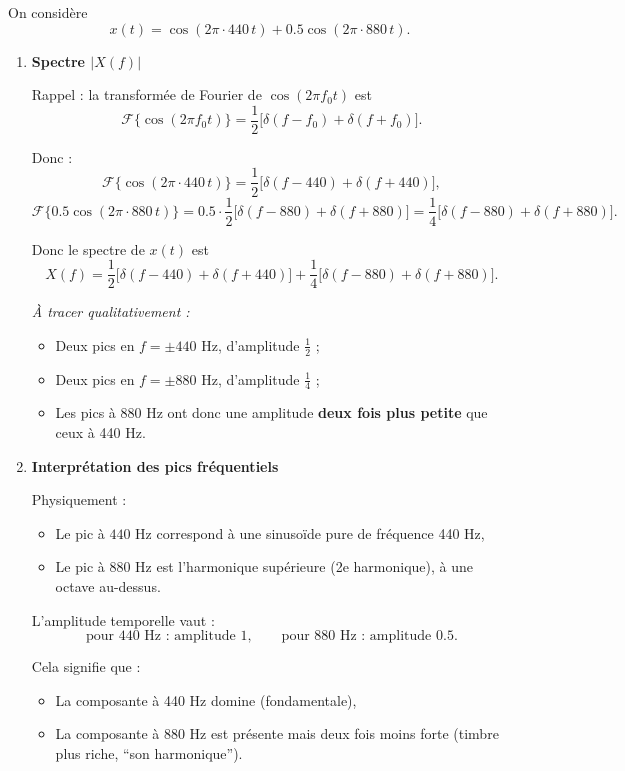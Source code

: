 On considère
\[
x(t) = \cos(2\pi \cdot 440\, t) + 0.5\cos(2\pi \cdot 880\, t).
\]

\begin{enumerate}[label=(\alph*)]

\item \textbf{Spectre $|X(f)|$}

Rappel : la transformée de Fourier de $\cos(2\pi f_0 t)$ est
\[
\mathcal{F}\{\cos(2\pi f_0 t)\}
= \frac{1}{2}\big[\delta(f-f_0) + \delta(f+f_0)\big].
\]

Donc :
\[
\mathcal{F}\{\cos(2\pi \cdot 440\, t)\}
= \frac{1}{2}\big[\delta(f-440) + \delta(f+440)\big],
\]
\[
\mathcal{F}\{0.5\cos(2\pi \cdot 880\, t)\}
= 0.5 \cdot \frac{1}{2}\big[\delta(f-880) + \delta(f+880)\big]
= \frac{1}{4}\big[\delta(f-880) + \delta(f+880)\big].
\]

Donc le spectre de $x(t)$ est
\[
X(f) = \frac{1}{2}\big[\delta(f-440) + \delta(f+440)\big]
     + \frac{1}{4}\big[\delta(f-880) + \delta(f+880)\big].
\]

\textit{À tracer qualitativement :}
\begin{itemize}
    \item Deux pics en $f = \pm 440$ Hz, d’amplitude $\tfrac{1}{2}$ ;
    \item Deux pics en $f = \pm 880$ Hz, d’amplitude $\tfrac{1}{4}$ ;
    \item Les pics à 880 Hz ont donc une amplitude \textbf{deux fois plus petite} que ceux à 440 Hz. \\
\end{itemize}

\item \textbf{Interprétation des pics fréquentiels}

Physiquement :
\begin{itemize}
    \item Le pic à $440$ Hz correspond à une sinusoïde pure de fréquence 440 Hz,
    \item Le pic à $880$ Hz est l’harmonique supérieure (2e harmonique), à une octave au-dessus.
\end{itemize}

L’amplitude temporelle vaut :
\[
\text{pour 440 Hz : amplitude } 1, \qquad
\text{pour 880 Hz : amplitude } 0.5.
\]

Cela signifie que :
\begin{itemize}
    \item La composante à 440 Hz domine (fondamentale),
    \item La composante à 880 Hz est présente mais deux fois moins forte (timbre plus riche, “son harmonique”).
\end{itemize}


\end{enumerate}
